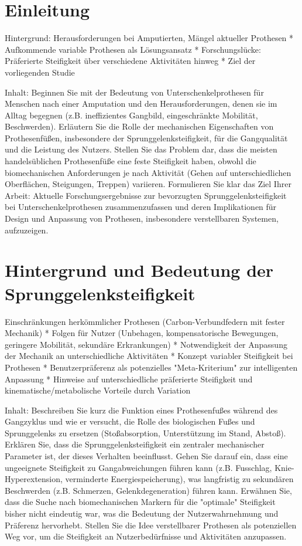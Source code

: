 \section{Einleitung}
\label{sec:introduction}
Hintergrund: Herausforderungen bei Amputierten, Mängel aktueller Prothesen *   Aufkommende variable Prothesen als Lösungsansatz *   Forschungslücke: Präferierte Steifigkeit über verschiedene Aktivitäten hinweg *   Ziel der vorliegenden Studie

Inhalt: Beginnen Sie mit der Bedeutung von Unterschenkelprothesen für Menschen nach einer Amputation und den Herausforderungen, denen sie im Alltag begegnen (z.B. ineffizientes Gangbild, eingeschränkte Mobilität, Beschwerden). Erläutern Sie die Rolle der mechanischen Eigenschaften von Prothesenfüßen, insbesondere der Sprunggelenksteifigkeit, für die Gangqualität und die Leistung des Nutzers. Stellen Sie das Problem dar, dass die meisten handelsüblichen Prothesenfüße eine feste Steifigkeit haben, obwohl die biomechanischen Anforderungen je nach Aktivität (Gehen auf unterschiedlichen Oberflächen, Steigungen, Treppen) variieren. Formulieren Sie klar das Ziel Ihrer Arbeit: Aktuelle Forschungsergebnisse zur bevorzugten Sprunggelenksteifigkeit bei Unterschenkelprothesen zusammenzufassen und deren Implikationen für Design und Anpassung von Prothesen, insbesondere verstellbaren Systemen, aufzuzeigen.

\section{Hintergrund und Bedeutung der Sprunggelenksteifigkeit}  
Einschränkungen herkömmlicher Prothesen (Carbon-Verbundfedern mit fester Mechanik) *   Folgen für Nutzer (Unbehagen, kompensatorische Bewegungen, geringere Mobilität, sekundäre Erkrankungen) *   Notwendigkeit der Anpassung der Mechanik an unterschiedliche Aktivitäten *   Konzept variabler Steifigkeit bei Prothesen *   Benutzerpräferenz als potenzielles "Meta-Kriterium" zur intelligenten Anpassung *   Hinweise auf unterschiedliche präferierte Steifigkeit und kinematische/metabolische Vorteile durch Variation

Inhalt: Beschreiben Sie kurz die Funktion eines Prothesenfußes während des Gangzyklus und wie er versucht, die Rolle des biologischen Fußes und Sprunggelenks zu ersetzen (Stoßabsorption, Unterstützung im Stand, Abstoß). Erklären Sie, dass die Sprunggelenksteifigkeit ein zentraler mechanischer Parameter ist, der dieses Verhalten beeinflusst. Gehen Sie darauf ein, dass eine ungeeignete Steifigkeit zu Gangabweichungen führen kann (z.B. Fusschlag, Knie-Hyperextension, verminderte Energiespeicherung), was langfristig zu sekundären Beschwerden (z.B. Schmerzen, Gelenkdegeneration) führen kann. Erwähnen Sie, dass die Suche nach biomechanischen Markern für die "optimale" Steifigkeit bisher nicht eindeutig war, was die Bedeutung der Nutzerwahrnehmung und Präferenz hervorhebt. Stellen Sie die Idee verstellbarer Prothesen als potenziellen Weg vor, um die Steifigkeit an Nutzerbedürfnisse und Aktivitäten anzupassen.